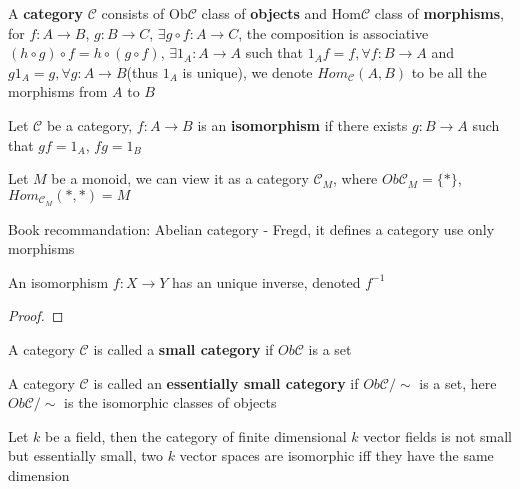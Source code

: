 \documentclass[../main.tex]{subfiles}
\begin{document}
\begin{definition}
A \textbf{category} $\mathscr{C}$ consists of $\mathrm{Ob}\mathscr{C}$ class of \textbf{objects} and $\mathrm{Hom}\mathscr{C}$ class of \textbf{morphisms}, for $f:A\to B$, $g:B\to C$, $\exists g\circ f:A\to C$, the composition is associative $(h\circ g)\circ f=h\circ(g\circ f)$, $\exists 1_A:A\to A$ such that $1_Af=f, \forall f:B\to A$ and $g1_A=g, \forall g:A\to B$(thus $1_A$ is unique), we denote $Hom_{\mathscr C}(A,B)$ to be all the morphisms from $A$ to $B$
\end{definition}

\begin{definition}
Let $\mathscr{C}$ be a category, $f:A\to B$ is an \textbf{isomorphism} if there exists $g:B\to A$ such that $gf=1_A$, $fg=1_B$
\end{definition}

\begin{example}
Let $M$ be a monoid, we can view it as a category $\mathscr C_M$, where $Ob\mathscr C_M=\{*\}$, $Hom_{\mathscr{C}_M}(*,*)=M$
\end{example}

\begin{remark}
Book recommandation: Abelian category - Fregd, it defines a category use only morphisms
\end{remark}

\begin{lemma}
An isomorphism $f:X\to Y$ has an unique inverse, denoted $f^{-1}$
\end{lemma}

\begin{proof}

\end{proof}

\begin{definition}
A category $\mathscr C$ is called a \textbf{small category} if $Ob\mathscr C$ is a set
\end{definition}

\begin{definition}
A category $\mathscr C$ is called an \textbf{essentially small category} if $Ob\mathscr C/\sim$ is a set, here $Ob\mathscr C/\sim$ is the isomorphic classes of objects
\end{definition}

\begin{example}
Let $k$ be a field, then the category of finite dimensional $k$ vector fields is not small but essentially small, two $k$ vector spaces are isomorphic iff they have the same dimension
\end{example}
\end{document}
